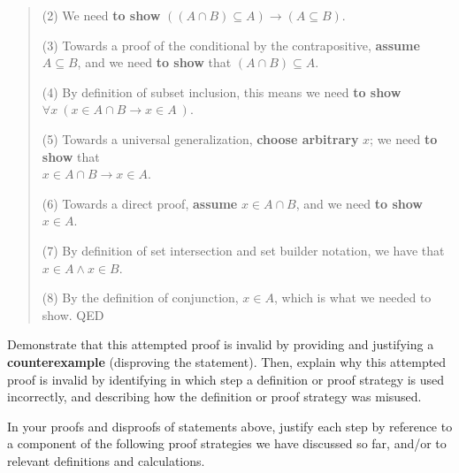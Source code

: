 \begin{enumerate}[labelindent=0pt, leftmargin=0pt]
\begin{enumerate}
\begin{quote}
    (2) We need {\bf to show} $((A \cap B) \subseteq A) \to (A \subseteq B)$.
    
    (3) Towards a proof of the conditional by the contrapositive, {\bf assume} $A \subseteq B$, and we need {\bf to show} 
    that $(A \cap B) \subseteq A$.
    
    (4) By definition of subset inclusion, this means we need {\bf to show} 
    $\forall x ~( x \in A \cap B \to  x \in A  ~)$.
    
    (5) Towards a universal generalization, {\bf choose arbitrary} $x$; we need {\bf to show} that \\
    $x \in A \cap B \to x \in A$.
    
    (6) Towards a direct proof, {\bf assume} $x \in A \cap B$, and we need {\bf to show } $x \in A$.
    
    (7) By definition of set intersection and set builder notation, we have that $x \in A \land x \in B$.
    
    (8) By the definition of conjunction, $x \in A$, which is  what we needed to show. QED
    \end{quote}
    
    Demonstrate that this attempted proof is invalid by providing
    and justifying a {\bf counterexample} (disproving the statement).
    Then, explain why this attempted proof is 
    invalid by identifying in which step a definition or proof strategy is used incorrectly, and describing how the 
    definition or proof strategy was misused.

\end{enumerate}

\end{enumerate}
\vfill
\newpage
In your proofs and disproofs of statements above, justify each  step
by reference to  a component of the  following proof  strategies
we  have discussed so far, and/or to relevant definitions and calculations.

